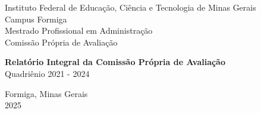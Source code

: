 
\thispagestyle{empty}

\begin{center}
    \small
    \sc Instituto Federal de Educação, Ciência e Tecnologia de Minas Gerais \\ 
    \sc Campus Formiga \\
    \sc Mestrado Profissional em Administração \\
    \sc Comissão Própria de Avaliação
    
    
    \vspace{6cm}
    \LARGE \textbf{Relatório Integral da Comissão Própria de Avaliação} \\
    \Large Quadriênio 2021 - 2024
    
    
    \vfill
    \large
    Formiga, Minas Gerais \\
    2025
\end{center}


\makeatletter
\def\@makechapterhead#1{%
  \vspace*{50\p@}%
  {\parindent \z@ \raggedright \normalfont
    \ifnum \c@secnumdepth >\m@ne
      \huge\bfseries \thechapter\space
    \fi
    \huge \bfseries #1\par\nobreak
    \vskip 40\p@
  }}
\makeatother
